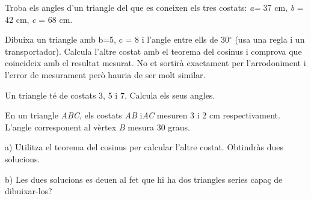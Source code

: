 \begin{mylist}
	
	
	\exer
	Troba els angles d'un triangle del que es coneixen els tres costats:
	\emph{a=} 37 cm, \emph{b} = 42 cm, \emph{c} = 68 cm.
	
	
	\exer
	Dibuixa un triangle amb b=5, c = 8 i l'angle entre ells de 30${}^\circ$ (usa
	una regla i un transportador). Calcula l'altre costat amb el teorema
	del cosinus i comprova que coincideix amb el resultat mesurat. No et
	sortirà exactament per l'arrodoniment i l'error de mesurament però
	hauria de ser molt similar.
	
	\exer
	Un triangle té de costats 3, 5 i 7. Calcula els seus angles.
		
	
	
	\exer
	En un triangle \emph{ABC}, els costats \emph{AB} i\emph{AC} mesuren 3
	i 2 cm respectivament. L'angle corresponent al vèrtex \emph{B} mesura
	30 graus.
	
	a) Utilitza el teorema del cosinus per calcular l'altre costat.
	Obtindràs dues solucions.
	
	b) Les dues solucions es deuen al fet que hi ha dos triangles series
	capaç de dibuixar-los?
	
	

\end{mylist}
